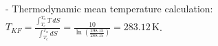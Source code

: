 - Thermodynamic mean temperature calculation:  
  \( T_{KF} = \frac{\int_{T_{e}}^{T_{a}} T \, dS}{\int_{T_{e}}^{T_{a}} dS} = \frac{10}{\ln\left(\frac{298.15}{288.15}\right)} = 283.12 \, \text{K} \).